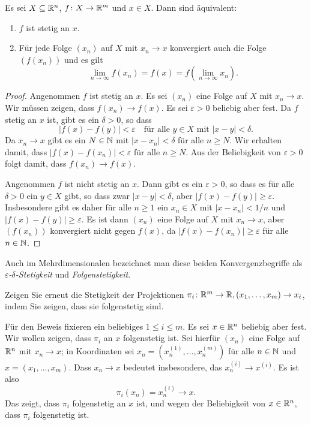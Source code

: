 \documentclass[a4paper,10pt]{article}
\begin{document}
\begin{lem}
 Es sei $X \subseteq \mathbb{R}^n$, $f \colon X \to \mathbb{R}^m$ und $x \in X$. Dann sind äquivalent:
 \begin{enumerate}
  \item
   $f$ ist stetig an $x$.
  \item
   Für jede Folge $(x_n)$ auf $X$ mit $x_n \to x$ konvergiert auch die Folge $(f(x_n))$ und es gilt
   \[
    \lim_{n \to \infty} f(x_n) = f(x) = f\left( \lim_{n \to \infty} x_n \right).
   \]
 \end{enumerate}
\end{lem}
\begin{proof}
 Angenommen $f$ ist stetig an $x$. Es sei $(x_n)$ eine Folge auf $X$ mit $x_n \to x$. Wir müssen zeigen, dass $f(x_n) \to f(x)$. Es sei $\varepsilon > 0$ beliebig aber fest. Da $f$ stetig an $x$ ist, gibt es ein $\delta > 0$, so dass
 \[
  |f(x) - f(y)| < \varepsilon \quad \text{für alle $y \in X$ mit $|x-y| < \delta$}.
 \]
 Da $x_n \to x$ gibt es ein $N \in \mathbb{N}$ mit $|x - x_n| < \delta$ für alle $n \geq N$. Wir erhalten damit, dass $|f(x) - f(x_n)| < \varepsilon$ für alle $n \geq N$. Aus der Beliebigkeit von $\varepsilon > 0$ folgt damit, dass $f(x_n) \to f(x)$.
 
 Angenommen $f$ ist nicht stetig an $x$. Dann gibt es ein $\varepsilon > 0$, so dass es für alle $\delta > 0$ ein $y \in X$ gibt, so dass zwar $|x-y| < \delta$, aber $|f(x)-f(y)| \geq \varepsilon$. Insbesondere gibt es daher für alle $n \geq 1$ ein $x_n \in X$ mit $|x - x_n| < 1/n$ und $|f(x) - f(y)| \geq \varepsilon$. Es ist dann $(x_n)$ eine Folge auf $X$ mit $x_n \to x$, aber $(f(x_n))$ konvergiert nicht gegen $f(x)$, da $|f(x) - f(x_n)| \geq \varepsilon$ für alle $n \in \mathbb{N}$.
\end{proof}


Auch im Mehrdimensionalen bezeichnet man diese beiden Konvergenzbegriffe als \emph{$\varepsilon$-$\delta$-Stetigkeit} und \emph{Folgenstetigkeit}.


\begin{question}
 Zeigen Sie erneut die Stetigkeit der Projektionen $\pi_i \colon \mathbb{R}^m \to \mathbb{R}, (x_1, \dotsc, x_m) \to x_i$, indem Sie zeigen, dass sie folgenstetig sind.
\end{question}
\begin{solution}
 Für den Beweis fixieren ein beliebiges $1 \leq i \leq m$. Es sei $x \in \mathbb{R}^n$ beliebig aber fest. Wir wollen zeigen, dass $\pi_i$ an $x$ folgenstetig ist. Sei hierfür $(x_n)$ eine Folge auf $\mathbb{R}^n$ mit $x_n \to x$; in Koordinaten sei $x_n = (x^{(1)}_n, \dotsc, x^{(m)}_n)$ für alle $n \in \mathbb{N}$ und $x = (x_1, \dotsc, x_m)$. Dass $x_n \to x$ bedeutet insbesondere, das $x^{(i)}_n \to x^{(i)}$. Es ist also
 \[
  \pi_i(x_n) = x^{(i)}_n \to x.
 \]
 Das zeigt, dass $\pi_i$ folgenstetig an $x$ ist, und wegen der Beliebigkeit von $x \in \mathbb{R}^n$, dass $\pi_i$ folgenstetig ist.
\end{solution}
\end{document}
